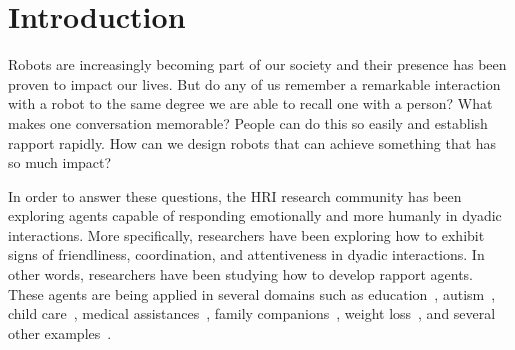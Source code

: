 






\section{Introduction}
\label{sec:Introduction}
Robots are increasingly becoming part of our society and their presence has been proven to impact our lives. But do any of us remember a remarkable interaction with a robot to the same degree we are able to recall one with a person? What makes one conversation memorable? People can do this so easily and establish rapport rapidly. How can we design robots that can achieve something that has so much impact?

In order to answer these questions, the \ac{HRI} research community has been exploring agents capable of responding emotionally and more humanly in dyadic interactions. More specifically, researchers have been exploring how to exhibit signs of friendliness, coordination, and attentiveness in dyadic interactions. In other words, researchers have been studying how to develop rapport agents. These agents are being applied in several domains such as education~\cite{Burroughs2007}, autism~\cite{Feil-Seifer2009, Scassellati2012}, child care~\cite{Burns1984}, medical assistances~\cite{Kang2005, Lisetti2013}, family companions~\cite{Bickmore2005}, weight loss~\cite{Fasola2012}, and several other examples~\cite{Marti2006, Nadler2003}.

